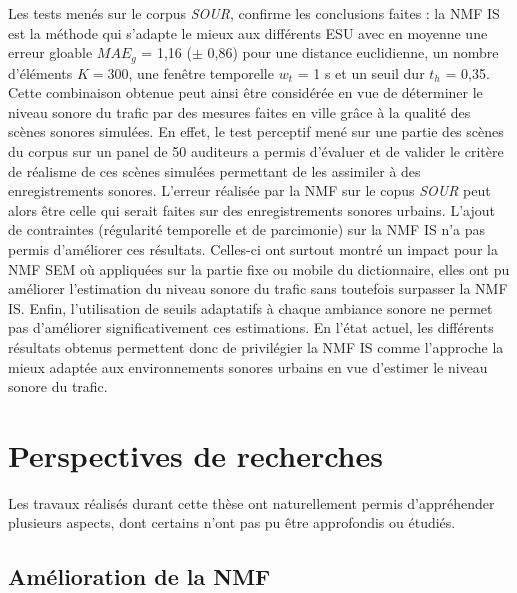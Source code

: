 Les tests menés sur le corpus \textit{SOUR}, confirme les conclusions faites : la NMF IS est la méthode qui s'adapte le mieux aux différents ESU avec en moyenne une erreur gloable $MAE_g$ = 1,16 ($\pm$ 0,86) pour une distance euclidienne, un nombre d'éléments $K = 300$, une fenêtre temporelle $w_t$ = 1 s et un seuil dur $t_h$ = 0,35. Cette combinaison obtenue peut ainsi être considérée en vue de déterminer le niveau sonore du trafic par des mesures faites en ville grâce à la qualité des scènes sonores simulées. En effet, le test perceptif mené sur une partie des scènes du corpus sur un panel de 50 auditeurs a permis d'évaluer et de valider le critère de \og réalisme \fg{} de ces scènes simulées permettant de les assimiler à des enregistrements sonores. L'erreur réalisée par la NMF sur le copus \textit{SOUR} peut alors être celle qui serait faites sur des enregistrements sonores urbains.
L'ajout de contraintes (régularité temporelle et de parcimonie) sur la NMF IS n'a pas permis d'améliorer ces résultats. Celles-ci ont surtout montré un impact pour la NMF SEM où appliquées sur la partie fixe ou mobile du dictionnaire, elles ont pu améliorer l'estimation du niveau sonore du trafic sans toutefois surpasser la NMF IS. Enfin, l'utilisation de seuils adaptatifs à chaque ambiance sonore ne permet pas d'améliorer significativement ces estimations. 
En l'état actuel, les différents résultats obtenus permettent donc de privilégier la NMF IS comme l'approche la mieux adaptée aux environnements sonores urbains en vue d'estimer le niveau sonore du trafic. 


\section*{Perspectives de recherches}

Les travaux réalisés durant cette thèse ont naturellement permis d'appréhender plusieurs aspects, dont certains n'ont pas pu être approfondis ou étudiés.

\subsection*{Amélioration de la NMF}

